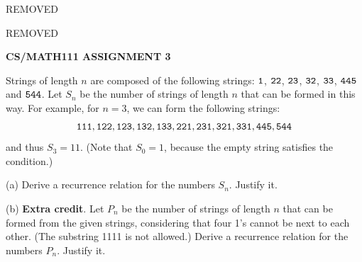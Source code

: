 \documentclass{article}
\begin{document}
\centerline{REMOVED}
\centerline{REMOVED}
\centerline{\large \bf CS/MATH111 ASSIGNMENT 3}

\vskip 0.2in


\vskip 0.1in


\newcommand{\ttA}{\texttt{A}}
\newcommand{\ttB}{\texttt{B}}
\newcommand{\ttC}{\texttt{C}}
\newcommand{\ttE}{\texttt{E}}
\newcommand{\ttF}{\texttt{F}}

\begin{problem}
Strings of length $n$ are composed of the following strings: $\tt1$, $\tt2\tt2$, $\tt2\tt3$, $\tt3\tt2$, $\tt3\tt3$,
$\tt4\tt4\tt5$ and $\tt5\tt4\tt4$. Let $S_n$ be the number of strings of length $n$ that can
be formed in this way. For example, for $n=3$, we can form the following strings:
%
\begin{align*}
\tt1\tt1\tt1
,
\tt1\tt2\tt2  , \tt1\tt2\tt3  , \tt1\tt3\tt2  , \tt1\tt3\tt3
,
\tt2\tt2\tt1  , \tt2\tt3\tt1  , \tt3\tt2\tt1  , \tt3\tt3\tt1 
,
\tt4\tt4\tt5 , \tt5\tt4\tt4
\end{align*}
%
and thus $S_3 = 11$. (Note that $S_0 = 1$, because the
empty string satisfies the condition.)

\smallskip
\noindent (a) Derive a recurrence relation for the numbers $S_n$. Justify it.

\smallskip
\noindent (b) \textbf{Extra credit}. Let $P_n$ be the number of strings of length $n$ that can
be formed from the given strings,  considering that four 1's cannot be next to each other. (The substring 1111 is not allowed.) Derive a recurrence relation for the numbers $P_n$. Justify it.
\smallskip
\end{problem}
\end{document}
